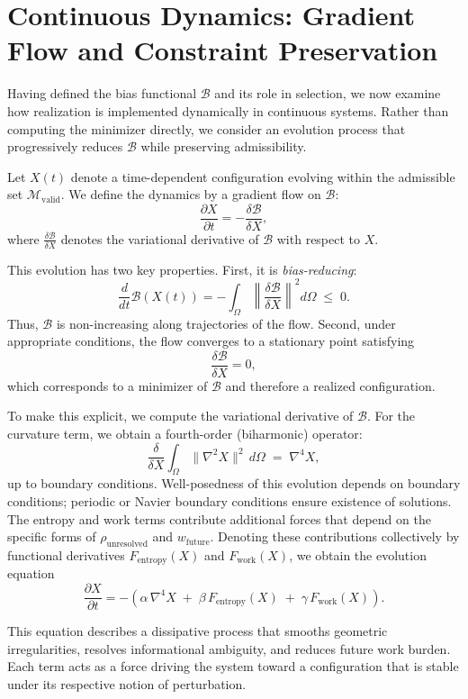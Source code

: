 \documentclass[11pt]{article}
\theoremstyle{plain}
\theoremstyle{definition}
\theoremstyle{remark}
\begin{document}
\section{Continuous Dynamics: Gradient Flow and Constraint Preservation}

Having defined the bias functional $\mathcal{B}$ and its role in selection, we now examine how realization is implemented dynamically in continuous systems. Rather than computing the minimizer directly, we consider an evolution process that progressively reduces $\mathcal{B}$ while preserving admissibility.

Let $X(t)$ denote a time-dependent configuration evolving within the admissible set $\mathcal{M}_{\mathrm{valid}}$. We define the dynamics by a gradient flow on $\mathcal{B}$:
\[
\frac{\partial X}{\partial t} = - \frac{\delta \mathcal{B}}{\delta X},
\]
where $\frac{\delta \mathcal{B}}{\delta X}$ denotes the variational derivative of $\mathcal{B}$ with respect to $X$.

This evolution has two key properties. First, it is \emph{bias-reducing}:
\[
\frac{d}{dt} \mathcal{B}(X(t)) = - \int_{\Omega} \left\| \frac{\delta \mathcal{B}}{\delta X} \right\|^2 d\Omega \;\leq\; 0.
\]
Thus, $\mathcal{B}$ is non-increasing along trajectories of the flow. Second, under appropriate conditions, the flow converges to a stationary point satisfying
\[
\frac{\delta \mathcal{B}}{\delta X} = 0,
\]
which corresponds to a minimizer of $\mathcal{B}$ and therefore a realized configuration.

To make this explicit, we compute the variational derivative of $\mathcal{B}$. For the curvature term, we obtain a fourth-order (biharmonic) operator:
\[
\frac{\delta}{\delta X} \int_{\Omega} \|\nabla^2 X\|^2 \, d\Omega \;=\; \nabla^4 X,
\]
up to boundary conditions. Well-posedness of this evolution depends on boundary conditions; periodic or Navier boundary conditions ensure existence of solutions. The entropy and work terms contribute additional forces that depend on the specific forms of $\rho_{\mathrm{unresolved}}$ and $w_{\mathrm{future}}$. Denoting these contributions collectively by functional derivatives $F_{\mathrm{entropy}}(X)$ and $F_{\mathrm{work}}(X)$, we obtain the evolution equation
\[
\frac{\partial X}{\partial t} = - \left( \alpha \, \nabla^4 X \;+\; \beta \, F_{\mathrm{entropy}}(X) \;+\; \gamma \, F_{\mathrm{work}}(X) \right).
\]

This equation describes a dissipative process that smooths geometric irregularities, resolves informational ambiguity, and reduces future work burden. Each term acts as a force driving the system toward a configuration that is stable under its respective notion of perturbation.
\end{document}
